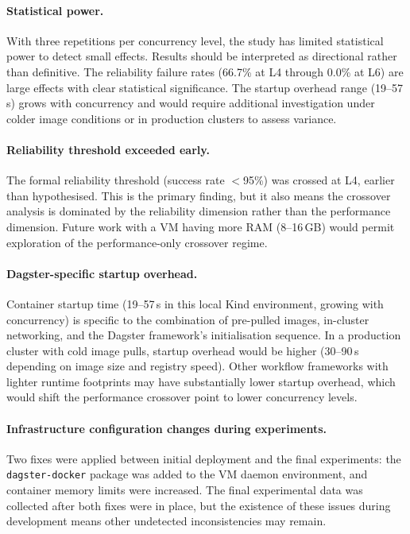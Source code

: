\paragraph{Statistical power.}
With three repetitions per concurrency level, the study has limited statistical power to detect small effects.
Results should be interpreted as directional rather than definitive.
The reliability failure rates (66.7\% at L4 through 0.0\% at L6) are large effects with clear statistical significance. The startup overhead range (19--57\,s) grows with concurrency and would require additional investigation under colder image conditions or in production clusters to assess variance.

\paragraph{Reliability threshold exceeded early.}
The formal reliability threshold (success rate $<$95\%) was crossed at L4, earlier than hypothesised.
This is the primary finding, but it also means the crossover analysis is dominated by the reliability dimension rather than the performance dimension.
Future work with a VM having more RAM (8--16\,GB) would permit exploration of the performance-only crossover regime.

\paragraph{Dagster-specific startup overhead.}
Container startup time (19--57\,s in this local Kind environment, growing with concurrency) is specific to the combination of pre-pulled images, in-cluster networking, and the Dagster framework's initialisation sequence. In a production cluster with cold image pulls, startup overhead would be higher (30--90\,s depending on image size and registry speed).
Other workflow frameworks with lighter runtime footprints may have substantially lower startup overhead, which would shift the performance crossover point to lower concurrency levels.

\paragraph{Infrastructure configuration changes during experiments.}
Two fixes were applied between initial deployment and the final experiments: the \texttt{dagster-docker} package was added to the VM daemon environment, and container memory limits were increased.
The final experimental data was collected after both fixes were in place, but the existence of these issues during development means other undetected inconsistencies may remain.

